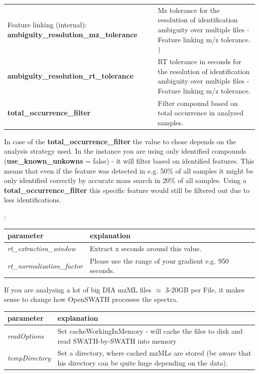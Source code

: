 \begin{center}
\begin{tabular*}{\textwidth}{ p{5.5cm}|p{10.5cm} }
Feature linking (internal):
\textbf{ambiguity\_resolution\_mz\_tolerance} & Mz tolerance for the resolution of identification ambiguity over multiple files - Feature linking m/z tolerance. ) \\
\textbf{ambiguity\_resolution\_rt\_tolerance} & RT tolerance in seconds for the resolution of identification ambiguity over multiple files - Feature linking m/z tolerance. \\
\textbf{total\_occurrence\_filter} & Filter compound based on total occurrence in analysed samples.\\
\end{tabular*}
\end{center}

In case of the \textbf{total\_occurrence\_filter} the value to chose depends on the analysis strategy used. In the instance you are using only identified compounds (\textbf{use\_known\_unkowns} = false) - it will filter based on identified features. This means that even if the feature was detected in e.g. 50\% of all samples it might be only identified correctly by accurate mass search in 20\% of all samples. Using a \textbf{total\_occurrence\_filter} this specific feature would still be filtered out  due to less identifications. 

\noindent{}:
\begin{center}
\begin{tabular*}{\textwidth}{ p{5.5cm}|p{10.5cm} }
\textbf{parameter} & \textbf{explanation} \\ \hline
\textit{rt\_extraction\_window} & Extract x seconds around this value. \\
\textit{rt\_normalization\_factor} &  Please use the range of your gradient e.g. 950 seconds. \\
\end{tabular*}
\end{center} 

\noindent If you are analysing a lot of big DIA mzML files $\approx$ 3-20GB per File, it makes sense to change how OpenSWATH processes the spectra. 

\begin{center}
\begin{tabular*}{\textwidth}{ p{5.5cm}|p{10.5cm} }
\textbf{parameter} & \textbf{explanation} \\ \hline
\textit{readOptions} & Set cacheWorkingInMemory - will cache the files to disk and read SWATH-by-SWATH into memory\\
\textit{tempDirectory} &  Set a directory, where cached mzMLs are stored (be aware that his directory can be quite huge depending on the data). \\
\end{tabular*}
\end{center} 

